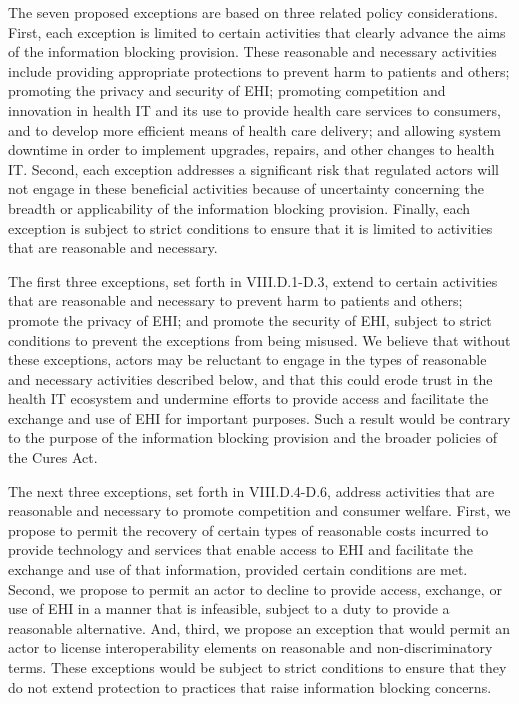 \documentclass[twoside,11pt]{article}
\begin{document}
          The seven proposed exceptions are based on three related policy considerations. First, each exception is limited to certain activities that clearly advance the aims of the information blocking provision. These reasonable and necessary activities include providing appropriate protections to prevent harm to patients and others; promoting the privacy and security of EHI; promoting competition and innovation in health IT and its use to provide health care services to consumers, and to develop more efficient means of health care delivery; and allowing system downtime in order to implement upgrades, repairs, and other changes to health IT. Second, each exception addresses a significant risk that regulated actors will not engage in these beneficial activities because of uncertainty concerning the breadth or applicability of the information blocking provision. Finally, each exception is subject to strict conditions to ensure that it is limited to activities that are reasonable and necessary.


          The first three exceptions, set forth in VIII.D.1-D.3, extend to certain activities that are reasonable and necessary to prevent harm to patients and others; promote the privacy of EHI; and promote the security of EHI, subject to strict conditions to prevent the exceptions from being misused. We believe that without these exceptions, actors may be reluctant to engage in the types of reasonable and necessary activities described below, and that this could erode trust in the health IT ecosystem and undermine efforts to provide access and facilitate the exchange and use of EHI for important purposes. Such a result would be contrary to the purpose of the information blocking provision and the broader policies of the Cures Act.



          The next three exceptions, set forth in VIII.D.4-D.6, address activities that are reasonable and necessary to promote competition and consumer welfare. First, we propose to permit the recovery of certain types of reasonable costs incurred to provide technology and services that enable access to EHI and facilitate the exchange and use of that information, provided certain conditions are met. Second, we propose to permit an actor to decline to provide access, exchange, or use of EHI in a manner that is infeasible, subject to a duty to provide a reasonable alternative. And, third, we propose an exception that would permit an actor to license interoperability elements on reasonable  \ifhmode\expandafter\xspace\fi and non-discriminatory terms. These exceptions would be subject to strict conditions to ensure that they do not extend protection to practices that raise information blocking concerns.
\end{document}
